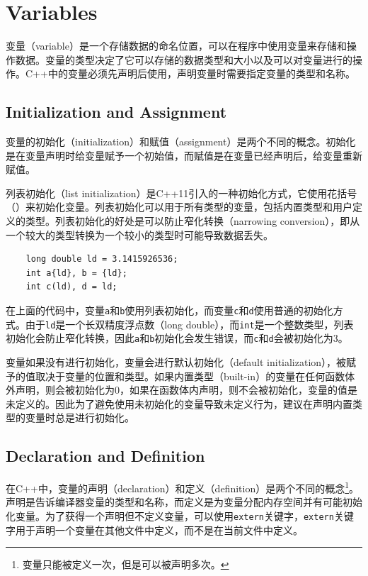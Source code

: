 \section{Variables}
变量（variable）是一个存储数据的命名位置，可以在程序中使用变量来存储和操作数据。变量的类型决定了它可以存储的数据类型和大小以及可以对变量进行的操作。C++中的变量必须先声明后使用，声明变量时需要指定变量的类型和名称。

\subsection{Initialization and Assignment}
变量的初始化（initialization）和赋值（assignment）是两个不同的概念。初始化是在变量声明时给变量赋予一个初始值，而赋值是在变量已经声明后，给变量重新赋值。

列表初始化（list initialization）是C++11引入的一种初始化方式，它使用花括号（\texttt{{}}）来初始化变量。列表初始化可以用于所有类型的变量，包括内置类型和用户定义的类型。列表初始化的好处是可以防止窄化转换（narrowing conversion），即从一个较大的类型转换为一个较小的类型时可能导致数据丢失。

\begin{verbatim}
    long double ld = 3.1415926536;
    int a{ld}, b = {ld};
    int c(ld), d = ld;
\end{verbatim}

在上面的代码中，变量\texttt{a}和\texttt{b}使用列表初始化，而变量\texttt{c}和\texttt{d}使用普通的初始化方式。由于\texttt{ld}是一个长双精度浮点数（long double），而\texttt{int}是一个整数类型，列表初始化会防止窄化转换，因此\texttt{a}和\texttt{b}初始化会发生错误，而\texttt{c}和\texttt{d}会被初始化为3。

变量如果没有进行初始化，变量会进行默认初始化（default initialization），被赋予的值取决于变量的位置和类型。如果内置类型（built-in）的变量在任何函数体外声明，则会被初始化为0，如果在函数体内声明，则不会被初始化，变量的值是未定义的。因此为了避免使用未初始化的变量导致未定义行为，建议在声明内置类型的变量时总是进行初始化。

\subsection{Declaration and Definition}
在C++中，变量的声明（declaration）和定义（definition）是两个不同的概念\footnote{变量只能被定义一次，但是可以被声明多次。}。声明是告诉编译器变量的类型和名称，而定义是为变量分配内存空间并有可能初始化变量。为了获得一个声明但不定义变量，可以使用\texttt{extern}关键字，\texttt{extern}关键字用于声明一个变量在其他文件中定义，而不是在当前文件中定义。

